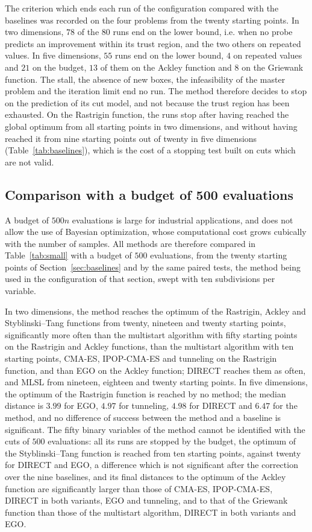 \documentclass[pdflatex,sn-basic]{sn-jnl}
\begin{document}
The criterion which ends each run of the configuration compared with the
baselines was recorded on the four problems from the twenty starting points.
In two dimensions, $78$ of the $80$ runs end on the lower bound, i.e. when no
probe predicts an improvement within its trust region, and the two others on
repeated values. In five dimensions, $55$ runs end on the lower bound, $4$ on
repeated values and $21$ on the budget, $13$ of them on the Ackley function and
$8$ on the Griewank function. The stall, the absence of new boxes, the
infeasibility of the master problem and the iteration limit end no run. The
method therefore decides to stop on the prediction of its cut model, and not
because the trust region has been exhausted. On the Rastrigin function, the
runs stop after having reached the global optimum from all starting points in two
dimensions, and without having reached it from nine starting points out of
twenty in five dimensions (Table~\ref{tab:baselines}), which is the cost of a
stopping test built on cuts which are not valid.

\subsection{Comparison with a budget of 500 evaluations}\label{sec:small}

A budget of $500n$ evaluations is large for industrial applications, and does not
allow the use of Bayesian optimization, whose computational cost grows cubically
with the number of samples. All methods are therefore compared in
Table~\ref{tab:small} with a budget of $500$ evaluations, from the twenty
starting points of Section~\ref{sec:baselines} and by the same paired tests, the
method being used in the configuration of that section, swept with ten
subdivisions per variable.



In two dimensions, the method reaches the optimum of the Rastrigin, Ackley and
Styblinski--Tang functions from twenty, nineteen and twenty starting points,
significantly more often than the multistart algorithm with fifty starting
points on the Rastrigin and Ackley functions, than the multistart algorithm with
ten starting points, CMA-ES, IPOP-CMA-ES and tunneling on the Rastrigin function,
and than EGO on the Ackley function; DIRECT reaches them as often, and MLSL from
nineteen, eighteen and twenty starting points. In five dimensions, the optimum
of the Rastrigin function is reached by no method; the median distance is
$3.99$ for EGO, $4.97$ for tunneling, $4.98$ for DIRECT and $6.47$ for the
method, and no difference of success between the method and a baseline is
significant. The fifty binary variables of the method cannot be identified with
the cuts of $500$ evaluations: all its runs are stopped by the budget, the
optimum of the Styblinski--Tang function is reached from ten starting points,
against twenty for DIRECT and EGO, a difference which is not significant after
the correction over the nine baselines, and its final distances to the optimum
of the Ackley function are significantly larger than those of CMA-ES,
IPOP-CMA-ES, DIRECT in both variants, EGO and tunneling, and to that of the
Griewank function than those of the multistart algorithm, DIRECT in both
variants and EGO.
\end{document}

